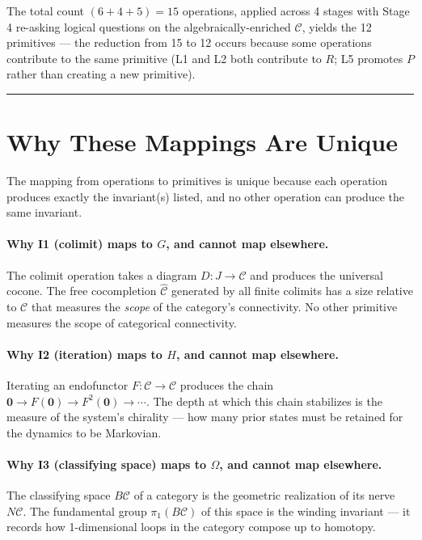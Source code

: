 \documentclass[12pt,a4paper]{article}
\begin{document}
The total count $(6 + 4 + 5) = 15$ operations, applied across 4 stages with Stage 4 re-asking logical questions on the algebraically-enriched $\mathcal{C}$, yields the 12 primitives --- the reduction from 15 to 12 occurs because some operations contribute to the same primitive (L1 and L2 both contribute to $R$; L5 promotes $P$ rather than creating a new primitive).

\begin{center}
\rule{0.5\textwidth}{0.4pt}
\end{center}

\section{Why These Mappings Are Unique}

The mapping from operations to primitives is unique because each operation produces exactly the invariant(s) listed, and no other operation can produce the same invariant. 

\paragraph{Why I1 (colimit) maps to $G$, and cannot map elsewhere.}
The colimit operation takes a diagram $D: J \to \mathcal{C}$ and produces the universal cocone. The free cocompletion $\hat{\mathcal{C}}$ generated by all finite colimits has a size relative to $\mathcal{C}$ that measures the \emph{scope} of the category's connectivity. No other primitive measures the scope of categorical connectivity.

\paragraph{Why I2 (iteration) maps to $H$, and cannot map elsewhere.}
Iterating an endofunctor $F: \mathcal{C} \to \mathcal{C}$ produces the chain $\mathbf{0} \to F(\mathbf{0}) \to F^2(\mathbf{0}) \to \cdots$. The depth at which this chain stabilizes is the measure of the system's chirality --- how many prior states must be retained for the dynamics to be Markovian.

\paragraph{Why I3 (classifying space) maps to $\Omega$, and cannot map elsewhere.}
The classifying space $B\mathcal{C}$ of a category is the geometric realization of its nerve $N\mathcal{C}$. The fundamental group $\pi_1(B\mathcal{C})$ of this space is the winding invariant --- it records how 1-dimensional loops in the category compose up to homotopy.
\end{document}
